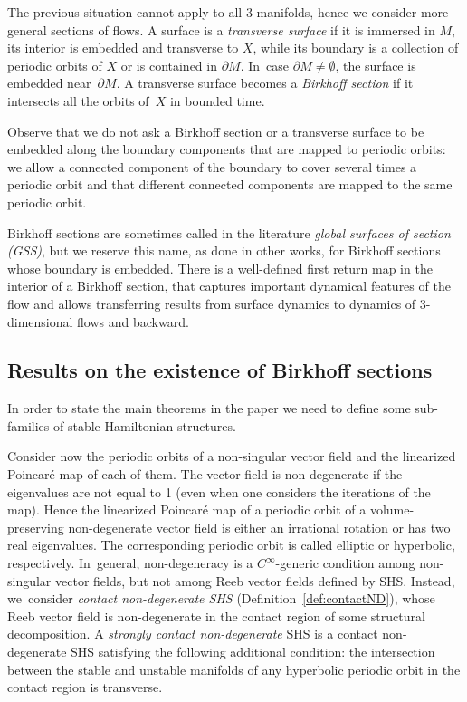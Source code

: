 \documentclass[11pt]{article}
\newcommand{\threemanifolds}{$3$\nobreakdash-mani\-folds\xspace}
\theoremstyle{definition}
\begin{document}
The previous situation cannot apply to all \threemanifolds, hence we consider more general sections of flows.
A surface is a \emph{transverse surface} if it is immersed in $M$, its interior is embedded and transverse to $X$, while its boundary is a collection of periodic orbits of $X$ or is contained in $\partial M$. In~case $\partial M\neq \emptyset$, the surface is embedded near~$\partial M$. A transverse surface becomes a \emph{Birkhoff section} if it intersects all the orbits of~$X$ in bounded time.

Observe that we do not ask a Birkhoff section or a transverse surface to be embedded along the boundary components that are mapped to periodic orbits: we allow a connected component of the boundary to cover several times a periodic orbit and that different connected components are mapped to the same periodic orbit.

Birkhoff sections are sometimes called in the literature \emph{global surfaces of section (GSS)}, but we reserve this name, as done in other works, for Birkhoff sections whose boundary is embedded. There is a well-defined first return map in the interior of a Birkhoff section, that captures important dynamical features of the flow and allows transferring results from surface dynamics to dynamics of 3-dimensional flows and backward.

\subsection{Results on the existence of Birkhoff sections} In order to state the main theorems in the paper we need to define some sub-families of stable Hamiltonian structures.

Consider now the periodic orbits of a non-singular vector field and the linearized Poincaré map of each of them.
The vector field is non-degenerate if the eigenvalues are not equal to 1 (even when one considers the iterations of the map). Hence the linearized Poincaré map of a periodic orbit of a volume-preserving non-degenerate vector field is either an irrational rotation or has two real eigenvalues. The corresponding periodic orbit is called elliptic or hyperbolic, respectively. In~general, non-degeneracy is a $C^\infty$\nobreakdash-generic condition among non-singular vector fields, but not among Reeb vector fields defined by SHS. Instead, we~consider \emph{contact non-degenerate SHS} (Definition~\ref{def:contactND}), whose Reeb vector field is non-degenerate in the contact region of some structural decomposition. A \emph{strongly contact non-degenerate} SHS is a contact non-degenerate SHS satisfying the following additional condition: the intersection between the stable and unstable manifolds of any hyperbolic periodic orbit in the contact region is transverse.
\end{document}
